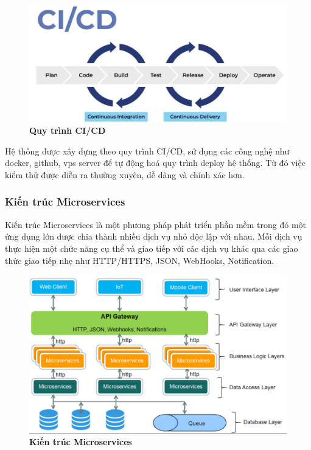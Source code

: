 \begin{figure}[H]
  \centering
  \includegraphics[scale=0.3]{Images/server/deploy/ci-cd.png}
  \caption[Quy trình CI/CD]{\bfseries \fontsize{12pt}{0pt}
  \selectfont Quy trình CI/CD}
  \label{ci-cd} %
\end{figure}

Hệ thống được xây dựng theo quy trình CI/CD, sử dụng các công nghệ như docker, github, vps server để tự động hoá quy trình deploy hệ thống. Từ đó việc kiểm thử được diễn ra thường xuyên, dễ dàng và chính xác hơn. 

\subsubsection{Kiến trúc Microservices}

Kiến trúc Microservices là một phương pháp phát triển phần mềm trong đó một ứng dụng lớn được chia thành nhiều dịch vụ nhỏ độc lập với nhau. Mỗi dịch vụ thực hiện một chức năng cụ thể và giao tiếp với các dịch vụ khác qua các giao thức giao tiếp nhẹ như HTTP/HTTPS, JSON, WebHooks, Notification.

\begin{figure}[H]
  \centering
  \includegraphics[scale=0.3]{Images/server/deploy/micro-service.png}
  \caption[Kiến trúc Microservices]{\bfseries \fontsize{12pt}{0pt}
  \selectfont Kiến trúc Microservices}
  \label{micro-service} %
\end{figure}

